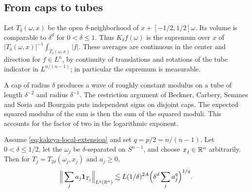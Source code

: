 

\subsection{From caps to tubes}

Let \(T_\delta(\omega,x)\) be the open \(\delta\)-neighborhood of
\(x+[-1/2,1/2]\omega\). Its volume is comparable to \(\delta^d\) for
\(0<\delta\le1\). Thus \(K_\delta f(\omega)\) is the supremum over
\(x\) of \(|T_\delta(\omega,x)|^{-1}\int_{T_\delta(\omega,x)}|f|\).
These averages are continuous in the center and direction for
\(f\in L^n\), by continuity of translations and rotations of the tube
indicator in \(L^{n/(n-1)}\); in particular the supremum is measurable.

A cap of radius \(\delta\) produces a wave of roughly constant modulus
on a tube of length \(\delta^{-2}\) and radius \(\delta^{-1}\).
The restriction argument of Beckner, Carbery, Semmes and Soria
\cite{BCSS1989Restriction} and Bourgain \cite{Bourgain1991Kakeya}
puts independent signs on disjoint caps. The expected squared modulus
of the sum is then the sum of the squared moduli. This accounts for
the factor of two in the logarithmic exponent.

\begin{lemma}\label{lem:kakeya-overlap}
Assume \eqref{eq:kakeya-local-extension} and set \(q=p/2=n/(n-1)\).
Let \(0<\delta\le1/2\), let the \(\omega_j\) be \(\delta\)-separated
on \(S^{n-1}\), and choose \(x_j\in\mathbb R^n\) arbitrarily. Then for
\(T_j=T_{2\delta}(\omega_j,x_j)\) and \(a_j\ge0\),
\begin{equation}\label{eq:kakeya-overlap}
 \Big\|\sum_j a_j\mathbf1_{T_j}\Big\|_{L^q(\mathbb R^n)}
  \lesssim L(1/\delta)^{2A}
              \Big(\delta^d\sum_j a_j^q\Big)^{1/q}.
\end{equation}
\end{lemma}

